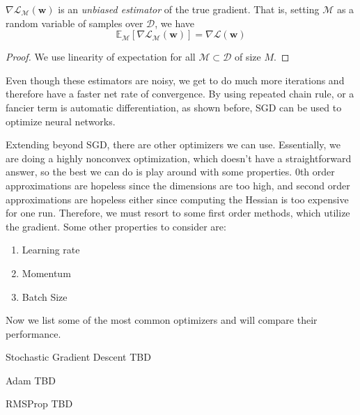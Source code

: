     \begin{theorem}
      $\nabla \mathcal{L}_{\mathcal{M}} (\mathbf{w})$ is an \textit{unbiased estimator} of the true gradient. That is, setting $\mathcal{M}$ as a random variable of samples over $\mathcal{D}$, we have 
      \begin{equation}
        \mathbb{E}_{\mathcal{M}} [\nabla \mathcal{L}_{\mathcal{M}} (\mathbf{w})] = \nabla \mathcal{L} (\mathbf{w})
      \end{equation}
    \end{theorem}
    \begin{proof}
      We use linearity of expectation for all $\mathcal{M} \subset \mathcal{D}$ of size $M$. 
    \end{proof}

    Even though these estimators are noisy, we get to do much more iterations and therefore have a faster net rate of convergence. By using repeated chain rule, or a fancier term is automatic differentiation, as shown before, SGD can be used to optimize neural networks. 

    Extending beyond SGD, there are other optimizers we can use. Essentially, we are doing a highly nonconvex optimization, which doesn't have a straightforward answer, so the best we can do is play around with some properties. 0th order approximations are hopeless since the dimensions are too high, and second order approximations are hopeless either since computing the Hessian is too expensive for one run. Therefore, we must resort to some first order methods, which utilize the gradient. Some other properties to consider are: 
    \begin{enumerate} 
      \item Learning rate 
      \item Momentum 
      \item Batch Size
    \end{enumerate}

    Now we list some of the most common optimizers and will compare their performance. 

    \begin{definition}{Stochastic Gradient Descent}
      TBD
    \end{definition}

    \begin{definition}{Adam}
      TBD
    \end{definition}

    \begin{definition}{RMSProp}
      TBD
    \end{definition}

